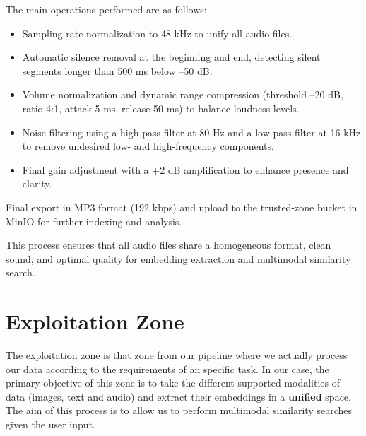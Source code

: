 \documentclass[12pt]{article}
\begin{document}
The main operations performed are as follows:

\begin{itemize}
    \item Sampling rate normalization to 48 kHz to unify all audio files.
\end{itemize}

\begin{itemize}
    \item Automatic silence removal at the beginning and end, detecting silent segments longer than 500 ms below –50 dB.
\end{itemize}

\begin{itemize}
    \item Volume normalization and dynamic range compression (threshold –20 dB, ratio 4:1, attack 5 ms, release 50 ms) to balance loudness levels.
\end{itemize}

\begin{itemize}
    \item Noise filtering using a high-pass filter at 80 Hz and a low-pass filter at 16 kHz to remove undesired low- and high-frequency components.
\end{itemize}

\begin{itemize}
    \item Final gain adjustment with a +2 dB amplification to enhance presence and clarity.
\end{itemize}


    Final export in MP3 format (192 kbps) and upload to the trusted-zone bucket in MinIO for further indexing and analysis.


This process ensures that all audio files share a homogeneous format, clean sound, and optimal quality for embedding extraction and multimodal similarity search.

\section{Exploitation Zone}
The exploitation zone is that zone from our pipeline where we actually process our data according to the requirements of an specific task. In our case, the primary objective of this zone is to take the different supported modalities of data (images, text and audio) and extract their embeddings in a \textbf{unified} space. The aim of this process is to allow us to perform multimodal similarity searches given the user input.
\end{document}
